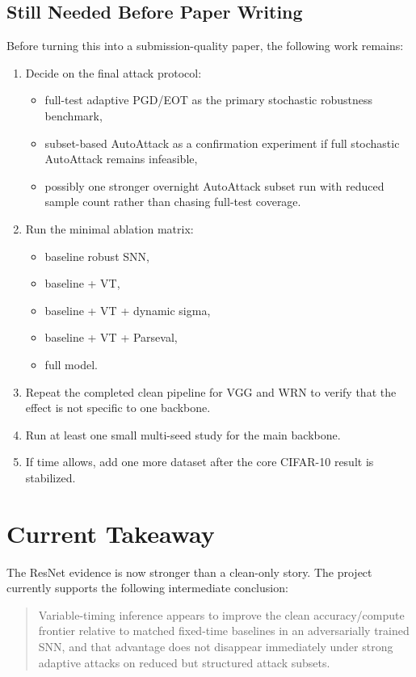 \documentclass[11pt]{article}
\begin{document}
\subsection{Still Needed Before Paper Writing}
Before turning this into a submission-quality paper, the following work remains:
\begin{enumerate}[leftmargin=1.5em]
    \item Decide on the final attack protocol:
    \begin{itemize}[leftmargin=1.5em]
        \item full-test adaptive PGD/EOT as the primary stochastic robustness benchmark,
        \item subset-based AutoAttack as a confirmation experiment if full stochastic AutoAttack remains infeasible,
        \item possibly one stronger overnight AutoAttack subset run with reduced sample count rather than chasing full-test coverage.
    \end{itemize}
    \item Run the minimal ablation matrix:
    \begin{itemize}[leftmargin=1.5em]
        \item baseline robust SNN,
        \item baseline + VT,
        \item baseline + VT + dynamic sigma,
        \item baseline + VT + Parseval,
        \item full model.
    \end{itemize}
    \item Repeat the completed clean pipeline for VGG and WRN to verify that the effect is not specific to one backbone.
    \item Run at least one small multi-seed study for the main backbone.
    \item If time allows, add one more dataset after the core CIFAR-10 result is stabilized.
\end{enumerate}

\section{Current Takeaway}
The ResNet evidence is now stronger than a clean-only story. The project currently supports the following intermediate conclusion:
\begin{quote}
Variable-timing inference appears to improve the clean accuracy/compute frontier relative to matched fixed-time baselines in an adversarially trained SNN, and that advantage does not disappear immediately under strong adaptive attacks on reduced but structured attack subsets.
\end{quote}
\end{document}
